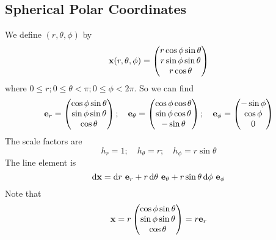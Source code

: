 \subsection{Spherical Polar Coordinates}
We define \((r, \theta, \phi)\) by
\[
	\vb x(r, \theta, \phi) = \begin{pmatrix}
		r \cos \phi \sin \theta \\
		r \sin \phi \sin \theta \\
		r \cos \theta
	\end{pmatrix}
\]
where \(0 \leq r; 0 \leq \theta < \pi; 0 \leq \phi < 2 \pi\).
So we can find
\[
	\vb e_r = \begin{pmatrix}
		\cos \phi \sin \theta \\ \sin \phi \sin \theta \\ \cos \theta
	\end{pmatrix};\quad \vb e_\theta = \begin{pmatrix}
		\cos \phi \cos \theta \\ \sin \phi \cos \theta \\ -\sin \theta
	\end{pmatrix};\quad \vb e_\phi = \begin{pmatrix}
		-\sin \phi \\ \cos \phi \\ 0
	\end{pmatrix}
\]
The scale factors are
\[
	h_r = 1;\quad h_\theta = r;\quad h_\phi = r \sin \theta
\]
The line element is
\[
	\dd \vb x = \dd{r} \, \vb e_r + r \dd{\theta} \, \vb e_\theta + r \sin \theta \dd{\phi} \, \vb e_\phi
\]
Note that
\[
	\vb x = r \begin{pmatrix}
		\cos \phi \sin \theta \\ \sin \phi \sin \theta \\ \cos \theta
	\end{pmatrix} = r \vb e_r
\]
